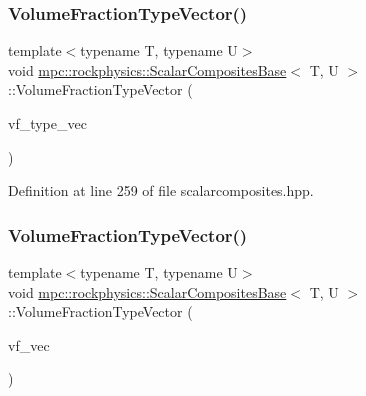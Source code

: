\subsubsection{\texorpdfstring{Volume\+Fraction\+Type\+Vector()}{VolumeFractionTypeVector()}\hspace{0.1cm}{\footnotesize\ttfamily [2/3]}}
{\footnotesize\ttfamily template$<$typename T, typename U$>$ \\
void \mbox{\hyperlink{classmpc_1_1rockphysics_1_1_scalar_composites_base}{mpc\+::rockphysics\+::\+Scalar\+Composites\+Base}}$<$ T, U $>$\+::Volume\+Fraction\+Type\+Vector (\begin{DoxyParamCaption}\item[{std\+::vector$<$ \mbox{\hyperlink{structmpc_1_1rockphysics_1_1_volume_fraction_type}{mpc\+::rockphysics\+::\+Volume\+Fraction\+Type}}$<$ T $>$ $>$}]{vf\+\_\+type\+\_\+vec }\end{DoxyParamCaption})\hspace{0.3cm}{\ttfamily [inline]}}



Definition at line 259 of file scalarcomposites.\+hpp.

\mbox{\label{classmpc_1_1rockphysics_1_1_scalar_composites_base_a5b7ed116d7ae42d8119b3b7481998863}} 
\subsubsection{\texorpdfstring{Volume\+Fraction\+Type\+Vector()}{VolumeFractionTypeVector()}\hspace{0.1cm}{\footnotesize\ttfamily [3/3]}}
{\footnotesize\ttfamily template$<$typename T, typename U$>$ \\
void \mbox{\hyperlink{classmpc_1_1rockphysics_1_1_scalar_composites_base}{mpc\+::rockphysics\+::\+Scalar\+Composites\+Base}}$<$ T, U $>$\+::Volume\+Fraction\+Type\+Vector (\begin{DoxyParamCaption}\item[{std\+::vector$<$ T $>$ \&}]{vf\+\_\+vec }\end{DoxyParamCaption})\hspace{0.3cm}{\ttfamily [inline]}}



